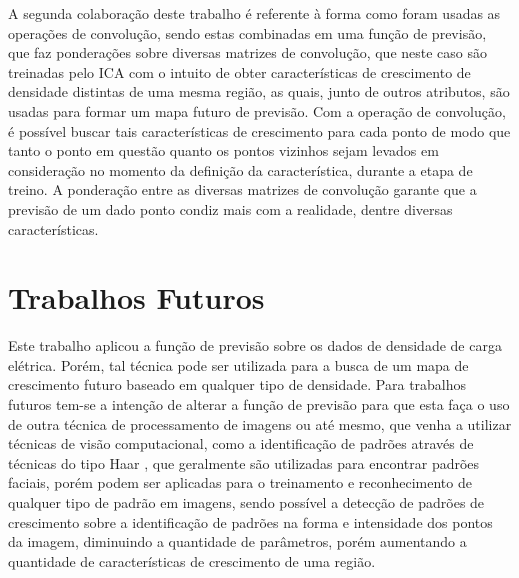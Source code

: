 A segunda colaboração deste trabalho é referente à forma como foram usadas as operações de convolução, sendo estas combinadas em uma função de previsão, que faz ponderações sobre diversas matrizes de convolução, que neste caso são treinadas pelo ICA com o intuito de obter características de crescimento de densidade distintas de uma mesma região, as quais, junto de outros atributos, são usadas para formar um mapa futuro de previsão. Com a operação de convolução, é possível buscar tais características de crescimento para cada ponto de modo que tanto o ponto em questão quanto os pontos vizinhos sejam levados em consideração no momento da definição da característica, durante a etapa de treino. A ponderação entre as diversas matrizes de convolução garante que a previsão de um dado ponto condiz mais com a realidade, dentre diversas características.

\section{Trabalhos Futuros}
\label{trabalhos_futuros}

Este trabalho aplicou a função de previsão sobre os dados de densidade de carga elétrica. Porém, tal técnica pode ser utilizada para a busca de um mapa de crescimento futuro baseado em qualquer tipo de densidade. Para trabalhos futuros tem-se a intenção de alterar a função de previsão para que esta faça o uso de outra técnica de processamento de imagens ou até mesmo, que venha a utilizar técnicas de visão computacional, como a identificação de padrões através de técnicas do tipo Haar \cite{mita2005joint}, que geralmente são utilizadas para encontrar padrões faciais, porém podem ser aplicadas para o treinamento e reconhecimento de qualquer tipo de padrão em imagens, sendo possível a detecção de padrões de crescimento sobre a identificação de padrões na forma e intensidade dos pontos da imagem, diminuindo a quantidade de parâmetros, porém aumentando a quantidade de características de crescimento de uma região.


